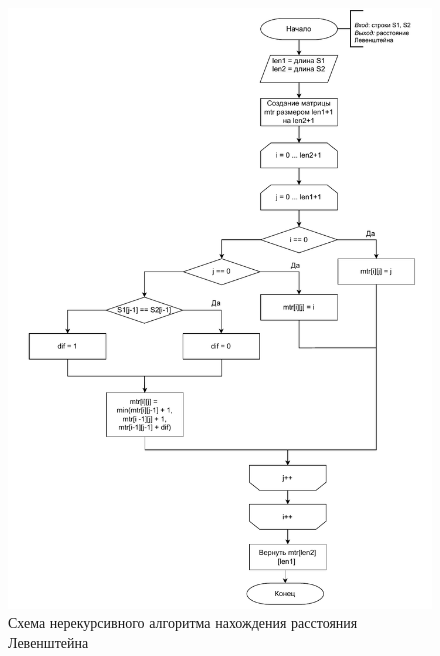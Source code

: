 \begin{figure}[h]
	\centering
	\includegraphics[height=0.7\textheight, page=1]{img/algoritms.pdf}
	\caption{Схема нерекурсивного алгоритма нахождения расстояния Левенштейна}
	\label{fig:Liter}
\end{figure}

\clearpage

